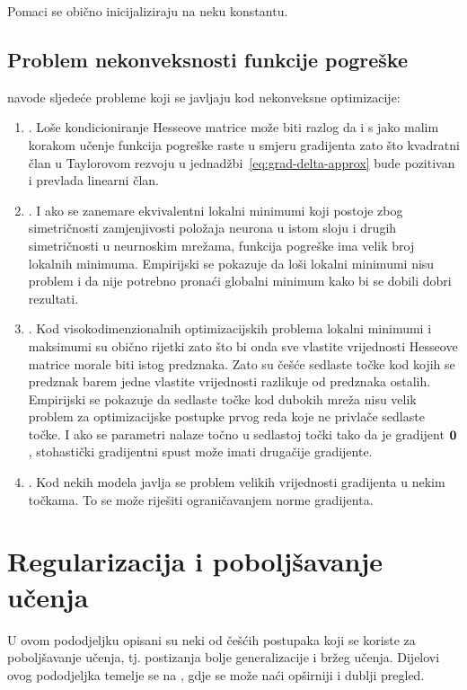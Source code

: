\documentclass[utf8, diplomski, lmodern]{fer}
\begin{document}
Pomaci se obično inicijaliziraju na neku konstantu.

\subsection{Problem nekonveksnosti funkcije pogreške}

\citet{Goodfellow:2016:DL} navode sljedeće probleme koji se javljaju kod nekonveksne optimizacije:
\begin{enumerate}
	\item {}. Loše kondicioniranje Hesseove matrice može biti razlog da i s jako malim korakom učenje funkcija pogreške raste u smjeru gradijenta zato što kvadratni član u Taylorovom rezvoju u jednadžbi~\eqref{eq:grad-delta-approx}  bude pozitivan i prevlada linearni član.
	\item {}. I ako se zanemare ekvivalentni lokalni minimumi koji postoje zbog simetričnosti zamjenjivosti položaja neurona u istom sloju i drugih simetričnosti u neurnoskim mrežama, funkcija pogreške ima velik broj lokalnih minimuma. Empirijski se pokazuje da loši lokalni minimumi nisu problem i da nije potrebno pronaći globalni minimum kako bi se dobili dobri rezultati.
	\item {}. Kod visokodimenzionalnih optimizacijskih problema lokalni minimumi i maksimumi su obično rijetki zato što bi onda sve vlastite vrijednosti Hesseove matrice morale biti istog predznaka. Zato su češće sedlaste točke kod kojih se predznak barem jedne vlastite vrijednosti razlikuje od predznaka ostalih. Empirijski se pokazuje da sedlaste točke kod dubokih mreža nisu velik problem za optimizacijske postupke prvog reda koje ne privlače sedlaste točke. I ako se parametri nalaze točno u sedlastoj točki tako da je gradijent $\mathbf{0}$, stohastički gradijentni spust može imati drugačije gradijente.
	\item {}. Kod nekih modela javlja se problem velikih vrijednosti gradijenta u nekim točkama. To se može riješiti ograničavanjem norme gradijenta.
\end{enumerate}


\section{Regularizacija i poboljšavanje učenja}

U ovom pododjeljku opisani su neki od češćih postupaka koji se koriste za poboljšavanje učenja, tj. postizanja bolje generalizacije i bržeg učenja. Dijelovi ovog pododjeljka temelje se na \citet{Goodfellow:2016:DL}, gdje se može naći opširniji i dublji pregled.
\end{document}
